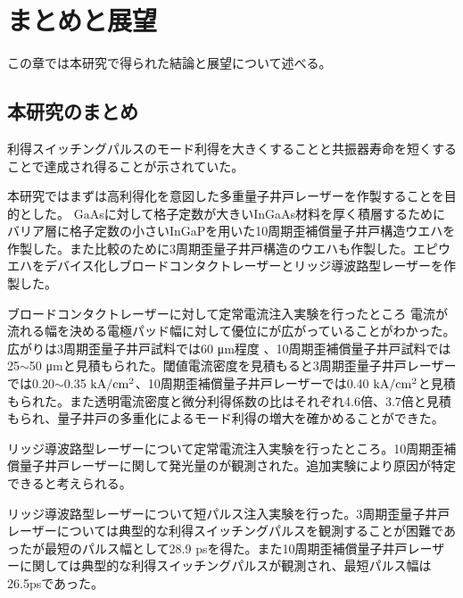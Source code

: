 
\chapter{まとめと展望}
この章では本研究で得られた結論と展望について述べる。
\section{本研究のまとめ}%


利得スイッチングパルスのモード利得を大きくすることと共振器寿命を短くすることで達成され得ることが示されていた。


本研究ではまずは高利得化を意図した多重量子井戸レーザーを作製することを目的とした。
GaAsに対して格子定数が大きいInGaAs材料を厚く積層するためにバリア層に格子定数の小さいInGaPを用いた10周期歪補償量子井戸構造ウエハを作製した。また比較のために3周期歪量子井戸構造のウエハも作製した。エピウエハをデバイス化しブロードコンタクトレーザーとリッジ導波路型レーザーを作製した。


ブロードコンタクトレーザーに対して定常電流注入実験を行ったところ
電流が流れる幅を決める電極パッド幅に対して優位にが広がっていることがわかった。広がりは3周期歪量子井戸試料では60 \si{\micro\metre}程度
、10周期歪補償量子井戸試料では25$\sim$50 \si{\micro\metre}と見積もられた。閾値電流密度を見積もると3周期歪量子井戸レーザーでは0.20$\sim$0.35 $\rm{kA/cm^{2}}$、10周期歪補償量子井戸レーザーでは0.40 $\rm{kA/cm^2}$と見積もられた。また透明電流密度と微分利得係数の比はそれぞれ4.6倍、3.7倍と見積もられ、量子井戸の多重化によるモード利得の増大を確かめることができた。

リッジ導波路型レーザーについて定常電流注入実験を行ったところ。10周期歪補償量子井戸レーザーに関して発光量のが観測された。追加実験により原因が特定できると考えられる。


リッジ導波路型レーザーについて短パルス注入実験を行った。3周期歪量子井戸レーザーについては典型的な利得スイッチングパルスを観測することが困難であったが最短のパルス幅として28.9 psを得た。また10周期歪補償量子井戸レーザーに関しては典型的な利得スイッチングパルスが観測され、最短パルス幅は26.5psであった。

